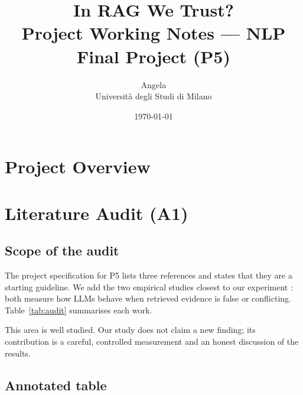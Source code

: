 \documentclass[11pt,a4paper]{report}
\title{\textbf{In RAG We Trust?}\\[4pt]
       \large Project Working Notes --- NLP Final Project (P5)}
\author{Angela\\ Università degli Studi di Milano}
\date{\today}
\begin{document}
\maketitle
{}  %
\tableofcontents

\chapter{Project Overview}\label{ch:overview}

\chapter{Literature Audit (A1)}\label{ch:literature}
\section{Scope of the audit}\label{sec:audit-scope}

The project specification for P5 lists three references
\citep{lewis2020rag,zhou2024trustworthiness,singal2024evidence} and states
that they are a starting guideline. We add the two empirical studies closest
to our experiment \citep{jin2024tugofwar,wu2024clasheval}: both measure how
LLMs behave when retrieved evidence is false or conflicting.
Table~\ref{tab:audit} summarises each work.

\begin{notebox}
This area is well studied. Our study does not claim a new finding; its
contribution is a careful, controlled measurement and an honest discussion
of the results.
\end{notebox}

\section{Annotated table}\label{sec:audit-table}
\end{document}

